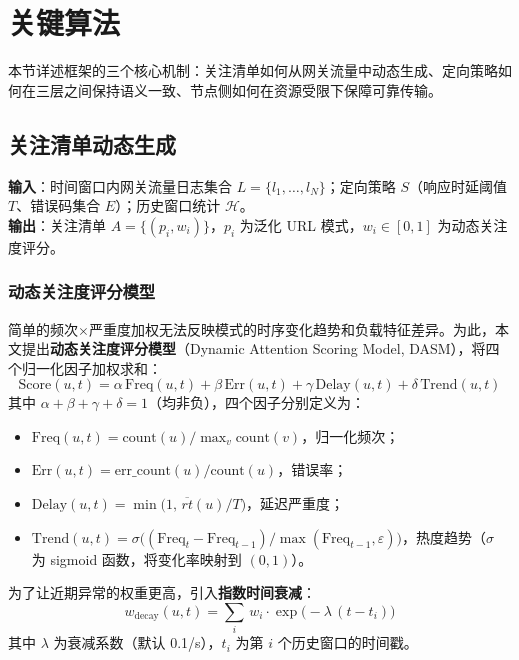 \section{关键算法}

本节详述框架的三个核心机制：关注清单如何从网关流量中动态生成、定向策略如何在三层之间保持语义一致、节点侧如何在资源受限下保障可靠传输。

\subsection{关注清单动态生成}
\textbf{输入}：时间窗口内网关流量日志集合 $L=\{l_1,\ldots,l_N\}$；定向策略 $S$（响应时延阈值 $T$、错误码集合 $E$）；历史窗口统计 $\mathcal{H}$。\\
\textbf{输出}：关注清单 $A=\{(p_i,w_i)\}$，$p_i$ 为泛化 URL 模式，$w_i \in [0,1]$ 为动态关注度评分。

\subsubsection{动态关注度评分模型}
简单的频次$\times$严重度加权无法反映模式的时序变化趋势和负载特征差异。为此，本文提出\textbf{动态关注度评分模型}（Dynamic Attention Scoring Model, DASM），将四个归一化因子加权求和：
\begin{equation}
\mathrm{Score}(u,t)=\alpha\,\mathrm{Freq}(u,t)+\beta\,\mathrm{Err}(u,t)+\gamma\,\mathrm{Delay}(u,t)+\delta\,\mathrm{Trend}(u,t)\label{eq:dasm}
\end{equation}
其中 $\alpha+\beta+\gamma+\delta=1$（均非负），四个因子分别定义为：
\begin{itemize}
  \item $\mathrm{Freq}(u,t)=\mathrm{count}(u)/\max_v \mathrm{count}(v)$，归一化频次；
  \item $\mathrm{Err}(u,t)=\mathrm{err\_count}(u)/\mathrm{count}(u)$，错误率；
  \item $\mathrm{Delay}(u,t)=\min\bigl(1,\,\overline{rt}(u)/T\bigr)$，延迟严重度；
  \item $\mathrm{Trend}(u,t)=\sigma\!\bigl((\mathrm{Freq}_t-\mathrm{Freq}_{t-1})/\max(\mathrm{Freq}_{t-1},\varepsilon)\bigr)$，热度趋势（$\sigma$ 为 sigmoid 函数，将变化率映射到 $(0,1)$）。
\end{itemize}

为了让近期异常的权重更高，引入\textbf{指数时间衰减}：
\begin{equation}
w_{\mathrm{decay}}(u,t)=\sum_{i}\,w_i\cdot\exp\!\bigl(-\lambda\,(t-t_i)\bigr)\label{eq:decay}
\end{equation}
其中 $\lambda$ 为衰减系数（默认 0.1/s），$t_i$ 为第 $i$ 个历史窗口的时间戳。


